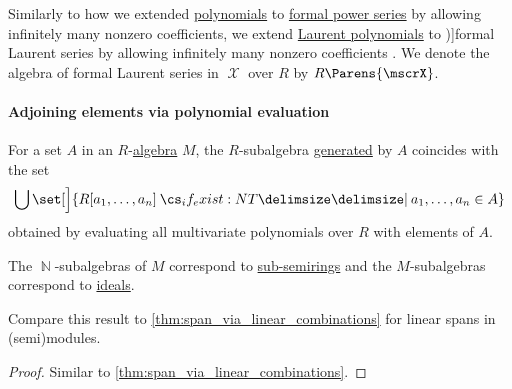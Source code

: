 \begin{definition}\label{def:formal_laurent_series}
  Similarly to how we extended \hyperref[def:polynomial_algebra/polynomials]{polynomials} to \hyperref[def:formal_power_series]{formal power series} by allowing infinitely many nonzero coefficients, we extend \hyperref[def:laurent_polynomial_algebra]{Laurent polynomials} to \term[ru=формальные ряды Лорана (\cite[23]{Шафаревич1999ОсновныеПонятияАлгебры})]{formal Laurent series} by allowing infinitely many nonzero coefficients . We denote the algebra of formal Laurent series in \( \mscrX \) over \( R \) by \( R\Parens{\mscrX} \).
\end{definition}

\paragraph{Adjoining elements via polynomial evaluation}

\begin{proposition}\label{thm:generators_via_polynomials}
  For a set \( A \) in an \( R \)-\hyperref[def:algebra_over_semiring]{algebra} \( M \), the \( R \)-subalgebra \hyperref[def:algebra_over_semiring/generated]{generated} by \( A \) coincides with the set
  \begin{equation*}
    \bigcup \set[\Big]{ R[a_1, \ldots, a_n] \given* a_1, \ldots, a_n \in A }
  \end{equation*}
  obtained by evaluating all multivariate polynomials over \( R \) with elements of \( A \).
\end{proposition}
\begin{comments}
  \item The \( \BbbN \)-subalgebras of \( M \) correspond to \hyperref[def:semiring/submodel]{sub-semirings} and the \( M \)-subalgebras correspond to \hyperref[def:semiring_ideal]{ideals}.

  \item Compare this result to \cref{thm:span_via_linear_combinations} for linear spans in (semi)modules.
\end{comments}
\begin{proof}
  Similar to \cref{thm:span_via_linear_combinations}.
\end{proof}

